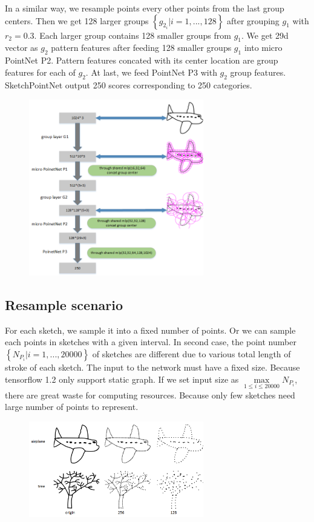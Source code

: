 In a similar way, we resample points every other points from the last group centers. Then we get 128 larger groups $\left\{ g_{2_i}| i = 1, ..., 128 \right\}$ after grouping $g_1$ with $r_2 = 0.3$. Each larger group contains 128 smaller groups from $g_1$. We get 29d vector as $g_2$ pattern features after feeding 128 smaller groups $g_1$ into micro PointNet P2. Pattern features concated with its center location are group features for each of $g_2$. At last, we feed PointNet P3 with $g_2$ group features. SketchPointNet output 250 scores corresponding to 250 categories.

\begin{figure}
    \center
    \includegraphics[width=3in]{images/sketchpointnet.png}
    \label{fig:sketchpointnet}
\end{figure}


\subsection{Resample scenario}
\label{ssec:resample_scenario}

For each sketch, we sample it into a fixed number of points. Or we can sample each points in sketches with a given interval. In second case, the point number $\left\{ N_{P_i}| i = 1, ..., 20000 \right\}$ of sketches are different due to various total length of stroke of each sketch. The input to the network must have a fixed size. Because tensorflow 1.2 only support static graph. If we set input size as $\max \limits_{1 \le i \le 20000} N_{P_i}$, there are great waste for computing resources. Because only few sketches need large number of points to represent.

\begin{figure}
    \center
    \includegraphics[width=3in]{images/resample2.png}
    \label{fig:resample}
\end{figure}


